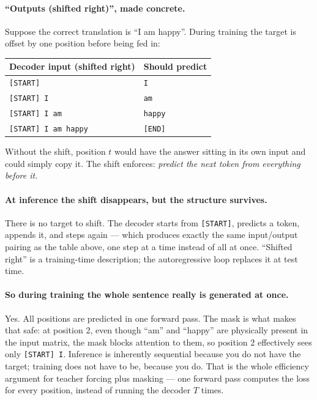 \documentclass[11pt,a4paper]{article}
\begin{document}
\paragraph{``Outputs (shifted right)'', made concrete.} Suppose the correct translation is
``I am happy''. During training the target is offset by one position before being fed in:
\begin{center}
\begin{tabular}{ll}
\textbf{Decoder input (shifted right)} & \textbf{Should predict} \\
\hline
\texttt{[START]} & \texttt{I} \\
\texttt{[START] I} & \texttt{am} \\
\texttt{[START] I am} & \texttt{happy} \\
\texttt{[START] I am happy} & \texttt{[END]} \\
\end{tabular}
\end{center}
Without the shift, position $t$ would have the answer sitting in its own input and could
simply copy it. The shift enforces: \emph{predict the next token from everything before it.}

\paragraph{At inference the shift disappears, but the structure survives.} There is no target
to shift. The decoder starts from \texttt{[START]}, predicts a token, appends it, and steps
again --- which produces exactly the same input/output pairing as the table above, one step at
a time instead of all at once. ``Shifted right'' is a training-time description; the
autoregressive loop replaces it at test time.

\paragraph{So during training the whole sentence really is generated at once.} Yes. All
positions are predicted in one forward pass. The mask is what makes that safe: at position 2,
even though ``am'' and ``happy'' are physically present in the input matrix, the mask blocks
attention to them, so position 2 effectively sees only \texttt{[START] I}. Inference is
inherently sequential because you do not have the target; training does not have to be,
because you do. That is the whole efficiency argument for teacher forcing plus masking --- one
forward pass computes the loss for every position, instead of running the decoder $T$ times.
\end{document}
